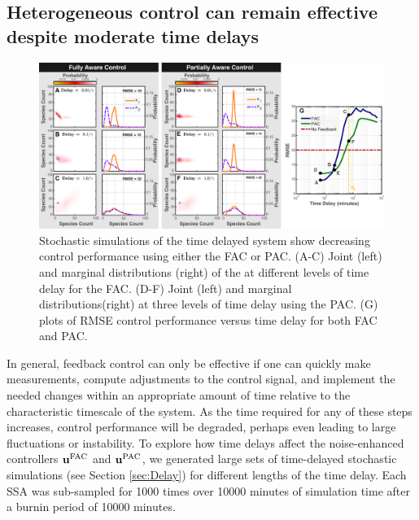 \documentclass[12pt]{iopart}
\begin{document}
\subsection{Heterogeneous control can remain effective despite moderate time delays}\label{sec:ResTime}
\begin{figure}
\begin{center}
\includegraphics[width=1\textwidth]{TimeDelay.pdf}
\vspace{-0.1in}
\caption{Stochastic simulations of the time delayed system show decreasing control performance using either the FAC or PAC. (A-C) Joint (left) and marginal distributions (right) of the at different levels of time delay for the FAC. (D-F) Joint (left) and marginal distributions(right) at three levels of time delay using the PAC.  (G) plots of RMSE control performance versus time delay for both FAC and PAC.}
\label{Time}
\end{center}
\vspace{-0.2in}
\end{figure}

In general, feedback control can only be effective if one can quickly make measurements, compute adjustments to the control signal, and implement the needed changes within an appropriate amount of time relative to the characteristic timescale of the system. As the time required for any of these steps increases, control performance will be degraded, perhaps even leading to large fluctuations or instability. To explore how time delays affect the noise-enhanced controllers $\mathbf{u}^{\rm FAC}$ and $\mathbf{u}^{\rm PAC}$, we generated large sets of time-delayed stochastic simulations (see Section \ref{sec:Delay}) for different lengths of the time delay. Each SSA was sub-sampled for 1000 times over 10000 minutes of simulation time after a burnin period of 10000 minutes.
\end{document}
